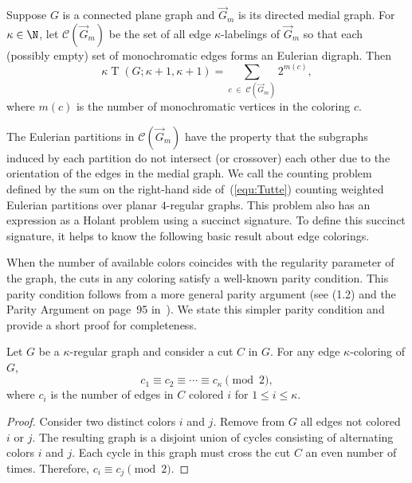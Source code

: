 \documentclass[11pt]{article}
\begin{document}
\begin{lemma} \label{lem:tutte_connection}
 Suppose $G$ is a connected plane graph and $\vec{G}_m$ is its directed medial graph.
 For $\kappa \in \N$,
 let $\mathcal{C}(\vec{G}_m)$ be the set of all edge $\kappa$-labelings of $\vec{G}_m$
 so that each (possibly empty) set of monochromatic edges forms an Eulerian digraph.
 Then
 \begin{equation}
  \kappa \operatorname{T}(G; \kappa+1, \kappa+1)
  = \sum_{c\; \in\; \mathcal{C}(\vec{G}_m)} 2^{m(c)}, \label{equ:Tutte}
 \end{equation}
 where $m(c)$ is the number of monochromatic vertices in the coloring $c$.
\end{lemma}

The Eulerian partitions in $\mathcal{C}(\vec{G}_m)$ have the property that the subgraphs induced by each partition do not intersect (or crossover) each other
due to the orientation of the edges in the medial graph.
We call the counting problem defined by the sum on the right-hand side of~(\ref{equ:Tutte})
counting weighted Eulerian partitions over planar $4$-regular graphs.
This problem also has an expression as a Holant problem using a succinct signature.
To define this succinct signature,
it helps to know the following basic result about edge colorings.

When the number of available colors coincides with the regularity parameter of the graph,
the cuts in any coloring satisfy a well-known parity condition.
This parity condition follows from a more general parity argument (see (1.2) and the Parity Argument on page~95 in~\cite{SSTF12}).
We state this simpler parity condition and provide a short proof for completeness.

\begin{lemma} \label{lem:k=r:parity_condition}
 Let $G$ be a $\kappa$-regular graph and consider a cut $C$ in $G$.
 For any edge $\kappa$-coloring of $G$,
 \[c_1 \equiv c_2 \equiv \dotsb \equiv c_\kappa \pmod{2},\]
 where $c_i$ is the number of edges in $C$ colored $i$ for $1 \le i \le \kappa$.
\end{lemma}

\begin{proof}
 Consider two distinct colors $i$ and $j$.
 Remove from $G$ all edges not colored $i$ or $j$.
 The resulting graph is a disjoint union of cycles consisting of alternating colors $i$ and $j$.
 Each cycle in this graph must cross the cut $C$ an even number of times.
 Therefore, $c_i \equiv c_j \pmod{2}$.
\end{proof}
\end{document}
